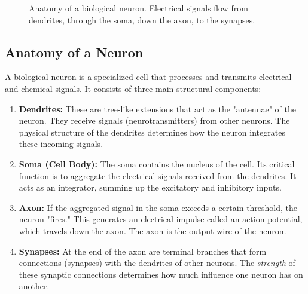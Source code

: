 \documentclass{tufte-handout}
\begin{document}
\begin{figure}[h]
{}
\caption{Anatomy of a biological neuron. Electrical signals flow from dendrites, through the soma, down the axon, to the synapses.}
\label{fig:bio_neuron}
\end{figure}

\subsection{Anatomy of a Neuron}

A biological neuron is a specialized cell that processes and transmits electrical and chemical signals. It consists of three main structural components:

\begin{enumerate}[leftmargin=*, itemsep=4pt]
    \item \textbf{Dendrites:} These are tree-like extensions that act as the "antennae" of the neuron. They receive signals (neurotransmitters) from other neurons. The physical structure of the dendrites determines how the neuron integrates these incoming signals.
    \item \textbf{Soma (Cell Body):} The soma contains the nucleus of the cell. Its critical function is to aggregate the electrical signals received from the dendrites. It acts as an integrator, summing up the excitatory and inhibitory inputs.
    \item \textbf{Axon:} If the aggregated signal in the soma exceeds a certain threshold, the neuron "fires." This generates an electrical impulse called an action potential, which travels down the axon. The axon is the output wire of the neuron.
    \item \textbf{Synapses:} At the end of the axon are terminal branches that form connections (synapses) with the dendrites of other neurons. The \textit{strength} of these synaptic connections determines how much influence one neuron has on another. 
\end{enumerate}
\end{document}
